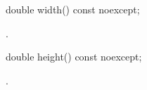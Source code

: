 %
%
\begin{itemdecl}
	double width() const noexcept;
\end{itemdecl}
\begin{itemdescr}
	\pnum
	\returns
	.
\end{itemdescr}

%
%
\begin{itemdecl}
	double height() const noexcept;
\end{itemdecl}
\begin{itemdescr}
	\pnum
	\returns
	.
\end{itemdescr}
